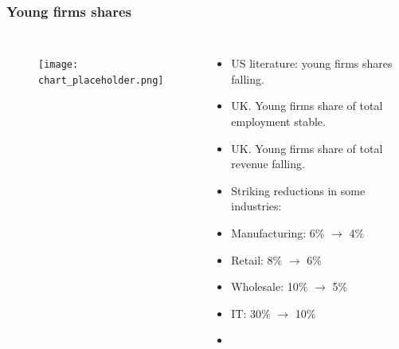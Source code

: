 \documentclass{beamer}
\begin{document}
\begin{frame}
\frametitle{Young firms shares}

\begin{columns}


\begin{figure}
\centering
\texttt{[image: chart\_placeholder.png]}
\end{figure}


\begin{itemize}
\item US literature: young firms shares falling.
\item UK. Young firms share of total employment stable.
\item UK. Young firms share of total revenue falling.
\item Striking reductions in some industries:
\item Manufacturing: 6\% $\rightarrow$ 4\% 
\item Retail: 8\% $\rightarrow$ 6\% 
\item Wholesale: 10\% $\rightarrow$ 5\%
\item IT: 30\% $\rightarrow$ 10\%

\item \href{https://www.rapidcharts.io/productivity}{}
\end{itemize}


\end{columns}
\end{frame}
\end{document}
